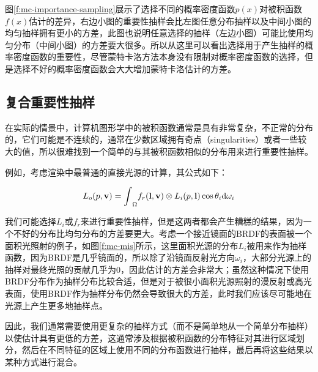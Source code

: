 图\ref{f:mc-importance-sampling}展示了选择不同的概率密度函数$p(x)$对被积函数$f(x)$估计的差异，右边小图的重要性抽样会比左图任意分布抽样以及中间小图的均匀抽样拥有更小的方差，此图也说明任意选择的抽样（左边小图）可能比使用均匀分布（中间小图）的方差要大很多。所以从这里可以看出选择用于产生抽样的概率密度函数的重要性，尽管蒙特卡洛方法本身没有限制对概率密度函数的选择，但是选择不好的概率密度函数会大大增加蒙特卡洛估计的方差。





\subsection{复合重要性抽样}\label{sec:mc-mis}
在实际的情景中，计算机图形学中的被积函数通常是具有非常复杂，不正常的分布的，它们可能是不连续的，通常在少数区域拥有奇点（singularities）或者一些较大的值，所以很难找到一个简单的与其被积函数相似的分布用来进行重要性抽样。

例如，考虑渲染中最普通的直接光源的计算，其公式如下：

\begin{equation}
	L_o({p},\mathbf{v})={\rm \int}_{\Omega}f_r(\mathbf{l},\mathbf{v})\otimes L_i({p},\mathbf{l})\cos\theta_i {\rm d}\omega_i
\end{equation}

我们可能选择$L_i$或$f_r$来进行重要性抽样，但是这两者都会产生糟糕的结果，因为一个不好的分布比均匀分布的方差要更大。考虑一个接近镜面的BRDF的表面被一个面积光照射的例子，如图\ref{f:mc-mis}所示，这里面积光源的分布$L_i$被用来作为抽样函数，因为BRDF是几乎镜面的，所以除了沿镜面反射光方向$\omega_i$，大部分光源上的抽样对最终光照的贡献几乎为0，因此估计的方差会非常大；虽然这种情况下使用BRDF分布作为抽样分布比较合适，但是对于被很小面积光源照射的漫反射或高光表面，使用BRDF作为抽样分布仍然会导致很大的方差，此时我们应该尽可能地在光源上产生更多地抽样点。

因此，我们通常需要使用更复杂的抽样方式（而不是简单地从一个简单分布抽样）以使估计具有更低的方差，这通常涉及根据被积函数的分布特征对其进行区域划分，然后在不同特征的区域上使用不同的分布函数进行抽样，最后再将这些结果以某种方式进行混合。

